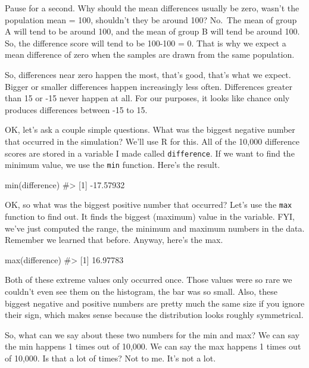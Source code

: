 \documentclass[
  letterpaper,
  DIV=11,
  numbers=noendperiod]{scrreprt}
\newenvironment{Shaded}{\begin{snugshade}}{\end{snugshade}}
\newcommand{\CommentTok}[1]{\textcolor[rgb]{0.37,0.37,0.37}{#1}}
\newcommand{\FunctionTok}[1]{\textcolor[rgb]{0.28,0.35,0.67}{#1}}
\newcommand{\NormalTok}[1]{\textcolor[rgb]{0.00,0.23,0.31}{#1}}
\begin{document}
Pause for a second. Why should the mean differences usually be zero,
wasn't the population mean = 100, shouldn't they be around 100? No.~The
mean of group A will tend to be around 100, and the mean of group B will
tend be around 100. So, the difference score will tend to be 100-100 =
0. That is why we expect a mean difference of zero when the samples are
drawn from the same population.

So, differences near zero happen the most, that's good, that's what we
expect. Bigger or smaller differences happen increasingly less often.
Differences greater than 15 or -15 never happen at all. For our
purposes, it looks like chance only produces differences between -15 to
15.

OK, let's ask a couple simple questions. What was the biggest negative
number that occurred in the simulation? We'll use R for this. All of the
10,000 difference scores are stored in a variable I made called
\texttt{difference}. If we want to find the minimum value, we use the
\texttt{min} function. Here's the result.

\begin{Shaded}
\begin{Highlighting}[]
\FunctionTok{min}\NormalTok{(difference)}
\CommentTok{\#\textgreater{} [1] {-}17.57932}
\end{Highlighting}
\end{Shaded}

OK, so what was the biggest positive number that occurred? Let's use the
\texttt{max} function to find out. It finds the biggest (maximum) value
in the variable. FYI, we've just computed the range, the minimum and
maximum numbers in the data. Remember we learned that before. Anyway,
here's the max.

\begin{Shaded}
\begin{Highlighting}[]
\FunctionTok{max}\NormalTok{(difference)}
\CommentTok{\#\textgreater{} [1] 16.97783}
\end{Highlighting}
\end{Shaded}

Both of these extreme values only occurred once. Those values were so
rare we couldn't even see them on the histogram, the bar was so small.
Also, these biggest negative and positive numbers are pretty much the
same size if you ignore their sign, which makes sense because the
distribution looks roughly symmetrical.

So, what can we say about these two numbers for the min and max? We can
say the min happens 1 times out of 10,000. We can say the max happens 1
times out of 10,000. Is that a lot of times? Not to me. It's not a lot.
\end{document}
